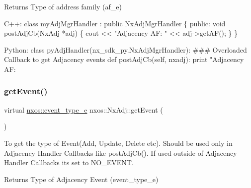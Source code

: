\begin{DoxyReturn}{Returns}
Type of address family (af\+\_\+e)
\end{DoxyReturn}

\begin{DoxyCode}
C++:
   \textcolor{keyword}{class }myAdjMgrHandler : \textcolor{keyword}{public} NxAdjMgrHandler \{
      \textcolor{keyword}{public}:
         \textcolor{keywordtype}{void} postAdjCb(NxAdj *adj) \{
              cout << \textcolor{stringliteral}{"Adjacency AF: "} << adj->getAF();
         \}
   \}

Python:
   \textcolor{keyword}{class }pyAdjHandler(nx\_sdk\_py.NxAdjMgrHandler):
\textcolor{preprocessor}{   ### Overloaded Callback to get Adjacency events}
         def postAdjCb(self, nxadj):
             print "Adjacency AF: %
\end{DoxyCode}
 \mbox{\label{classnxos_1_1_nx_adj_a75c503c316c39c12aa8b4c431c81d2de}} 
\subsubsection{\texorpdfstring{get\+Event()}{getEvent()}}
{\footnotesize\ttfamily virtual \mbox{\hyperlink{namespacenxos_af9a9040b7681199d386e94eb888018cb}{nxos\+::event\+\_\+type\+\_\+e}} nxos\+::\+Nx\+Adj\+::get\+Event (\begin{DoxyParamCaption}{ }\end{DoxyParamCaption})\hspace{0.3cm}{\ttfamily [pure virtual]}}

To get the type of Event(\+Add, Update, Delete etc). Should be used only in Adjacency Handler Callbacks like post\+Adj\+Cb(). If used outside of Adjacency Handler Callbacks its set to N\+O\+\_\+\+E\+V\+E\+NT.

\begin{DoxyReturn}{Returns}
Type of Adjacency Event (event\+\_\+type\+\_\+e)
\end{DoxyReturn}

